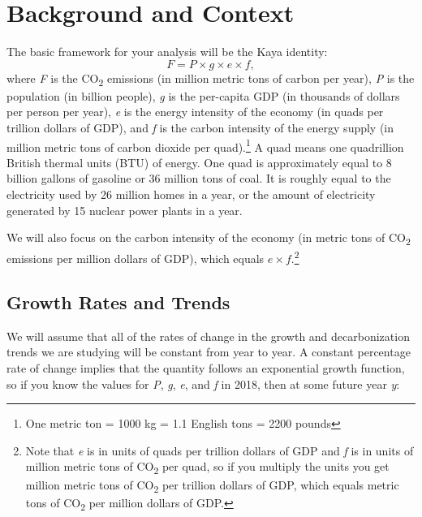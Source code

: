 \documentclass[
]{article}
\begin{document}
\hypertarget{background-and-context}{%
\section{Background and Context}\label{background-and-context}}

The basic framework for your analysis will be the Kaya identity: \[
F = P \times g \times e \times f,
\] where \emph{F} is the CO\textsubscript{2} emissions (in million
metric tons of carbon per year), \emph{P} is the population (in billion
people), \emph{g} is the per-capita GDP (in thousands of dollars per
person per year), \emph{e} is the energy intensity of the economy (in
quads per trillion dollars of GDP), and \emph{f} is the carbon intensity
of the energy supply (in million metric tons of carbon dioxide per
quad).\footnote{One metric ton = 1000 kg = 1.1 English tons = 2200
  pounds} A quad means one quadrillion British thermal units (BTU) of
energy. One quad is approximately equal to 8 billion gallons of gasoline
or 36 million tons of coal. It is roughly equal to the electricity used
by 26 million homes in a year, or the amount of electricity generated by
15 nuclear power plants in a year.

We will also focus on the carbon intensity of the economy (in metric
tons of CO\textsubscript{2} emissions per million dollars of GDP), which
equals \(e \times f\).\footnote{Note that \emph{e} is in units of quads
  per trillion dollars of GDP and \emph{f} is in units of million metric
  tons of CO\textsubscript{2} per quad, so if you multiply the units you
  get million metric tons of CO\textsubscript{2} per trillion dollars of
  GDP, which equals metric tons of CO\textsubscript{2} per million
  dollars of GDP.}

\hypertarget{growth-rates-and-trends}{%
\subsection{Growth Rates and Trends}\label{growth-rates-and-trends}}

We will assume that all of the rates of change in the growth and
decarbonization trends we are studying will be constant from year to
year. A constant percentage rate of change implies that the quantity
follows an exponential growth function, so if you know the values for
\emph{P}, \emph{g}, \emph{e}, and \emph{f} in 2018, then at some future
year \emph{y}:
\end{document}
